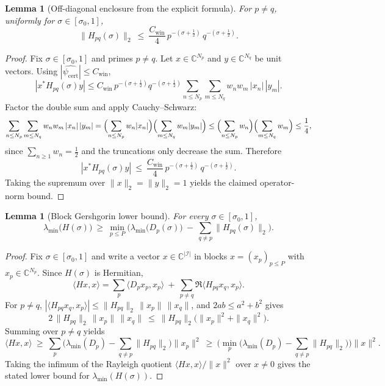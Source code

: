 \documentclass[11pt]{article}
\newtheorem{lemma}[theorem]{Lemma}
\theoremstyle{definition}
\theoremstyle{remark}
\theoremstyle{definition}
\newcommand{\C}{\mathbb{C}}
\begin{document}
\begin{lemma}[Off-diagonal enclosure from the explicit formula]\label{lem:offdiag-enclosure}
For $p\neq q$, uniformly for $\sigma\in[\sigma_0,1]$,
\[
  \|H_{pq}(\sigma)\|_2\ \le\ \frac{C_{\mathrm{win}}}{4}\,p^{-(\sigma+\tfrac12)}\,q^{-(\sigma+\tfrac12)}.
\]
\end{lemma}
\begin{proof}
Fix $\sigma\in[\sigma_0,1]$ and primes $p\neq q$. Let $x\in\C^{N_p}$ and $y\in\C^{N_q}$ be unit vectors.
Using $|\widehat{\psi_{\mathrm{cert}}}|\le C_{\mathrm{win}}$,
\[
  |x^*H_{pq}(\sigma)y|
  \le C_{\mathrm{win}}\,p^{-(\sigma+\tfrac12)}q^{-(\sigma+\tfrac12)}
     \sum_{n\le N_p}\sum_{m\le N_q} w_n w_m\,|x_n|\,|y_m|.
\]
Factor the double sum and apply Cauchy--Schwarz:
\[
  \sum_{n\le N_p}\sum_{m\le N_q} w_n w_m\,|x_n|\,|y_m|
  =\Bigl(\sum_{n\le N_p} w_n|x_n|\Bigr)\Bigl(\sum_{m\le N_q} w_m|y_m|\Bigr)
  \le\Bigl(\sum_{n\le N_p} w_n\Bigr)\Bigl(\sum_{m\le N_q} w_m\Bigr)
  \le \frac14,
\]
since $\sum_{n\ge 1}w_n=\tfrac12$ and the truncations only decrease the sum.
Therefore
\[
  |x^*H_{pq}(\sigma)y|\ \le\ \frac{C_{\mathrm{win}}}{4}\,p^{-(\sigma+\tfrac12)}\,q^{-(\sigma+\tfrac12)}.
\]
Taking the supremum over $\|x\|_2=\|y\|_2=1$ yields the claimed operator-norm bound.
\end{proof}
\begin{lemma}[Block Gershgorin lower bound]\label{lem:block-gersh}
For every $\sigma\in[\sigma_0,1]$,
\[
  \lambda_{\min}\big(H(\sigma)\big)\ \ge\ \min_{p\le P}\Big(\lambda_{\min}\big(D_p(\sigma)\big)\ -\ \sum_{q\ne p}\|H_{pq}(\sigma)\|_2\Big).
\]
\end{lemma}
\begin{proof}
Fix $\sigma\in[\sigma_0,1]$ and write a vector $x\in\C^{|\mathcal I|}$ in blocks $x=(x_p)_{p\le P}$ with $x_p\in\C^{N_p}$. Since $H(\sigma)$ is Hermitian,
\[
  \langle Hx,x\rangle
  =\sum_{p}\langle D_p x_p,x_p\rangle\ +\ \sum_{p\neq q}\Re\langle H_{pq}x_q,x_p\rangle.
\]
For $p\neq q$, $|\langle H_{pq}x_q,x_p\rangle|\le \|H_{pq}\|_2\,\|x_p\|\,\|x_q\|$, and $2ab\le a^2+b^2$ gives
\[
  2\,\|H_{pq}\|_2\,\|x_p\|\,\|x_q\|\ \le\ \|H_{pq}\|_2\big(\|x_p\|^2+\|x_q\|^2\big).
\]
Summing over $p\neq q$ yields
\[
  \langle Hx,x\rangle\ \ge\ \sum_p \Big(\lambda_{\min}(D_p)-\sum_{q\neq p}\|H_{pq}\|_2\Big)\|x_p\|^2
  \ \ge\ \Big(\min_{p}\Big(\lambda_{\min}(D_p)-\sum_{q\neq p}\|H_{pq}\|_2\Big)\Big)\|x\|^2.
\]
Taking the infimum of the Rayleigh quotient $\langle Hx,x\rangle/\|x\|^2$ over $x\neq0$ gives the stated lower bound for $\lambda_{\min}(H(\sigma))$.
\end{proof}
\end{document}
